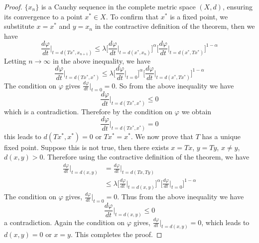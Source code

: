 \documentclass[10pt,a4paper]{amsart}
\begin{document}
\begin{proof}
$\{x_n\}$ is a Cauchy sequence in the complete metric space $(X,d)$, ensuring its convergence to a point $x^{*}\in X$. To confirm that $x^{*}$ is a fixed point, we
substitute $x=x^{*}$ and $y=x_n$ in the contractive definition of the theorem, then we have
$$ \frac{d\varphi}{dt}\bigg|_{t=d(Tx^{*},x_{n+1})} \leq \lambda \bigg[\frac{d\varphi}{dt}\bigg|_{t=d(x^{*},x_n)}\bigg]^{\alpha} \bigg[\frac{d\varphi}{dt}\bigg|_{t=d(x^{*},Tx^{*})}\bigg]^{1-\alpha}$$ Letting $n\rightarrow \infty$ in the above inequality, we have
$$\frac{d\varphi}{dt}\bigg|_{t=d(Tx^{*},x^{*})}\leq \lambda \bigg[\frac{d\varphi}{dt}\bigg|_{t=0}\bigg]^{\alpha} \bigg[\frac{d\varphi}{dt}\bigg|_{t=d(x^{*},Tx^{*})}\bigg]^{1-\alpha}$$ The condition on $\varphi$ gives $\frac{d\varphi}{dt}\bigg|_{t=0}=0$. So from the above inequality we have
$$\frac{d\varphi}{dt}\bigg|_{t=d(Tx^{*},x^{*})} \leq 0$$ which is a contradiction. Therefore by the condition on $\varphi$ we obtain
$$\frac{d\varphi}{dt}\bigg|_{t=d(Tx^{*},x^{*})}=0$$ this leads to $d(Tx^{*},x^{*})=0$ or $Tx^{*}=x^{*}$. We now prove that $T$ has a unique fixed point. Suppose this is not true, then there exists $x=Tx$, $y=Ty$, $x\neq y$, $d(x,y)>0$. Therefore using the contractive definition of the theorem, we have
\begin{align*}
\frac{d\varphi}{dt}\bigg|_{t=d(x,y)} &= \frac{d\varphi}{dt}\bigg|_{t=d(Tx,Ty)}\\
&\leq \lambda \bigg[\frac{d\varphi}{dt}\bigg|_{t=d(x,y)}\bigg]^{\alpha} \bigg[\frac{d\varphi}{dt}\bigg|_{t=0}\bigg]^{1-\alpha}
\end{align*}
The condition on $\varphi$ gives, $\frac{d\varphi}{dt}\bigg|_{t=0}=0$. Thus from the above inequality we have $$\frac{d\varphi}{dt}\bigg|_{t=d(x,y)}\leq 0$$ a contradiction. Again the condition on $\varphi$ gives, $\frac{d\varphi}{dt}\bigg|_{t=d(x,y)}=0$, which leads to $d(x,y)=0$ or $x=y$. This completes the proof.
\end{proof}
\end{document}
